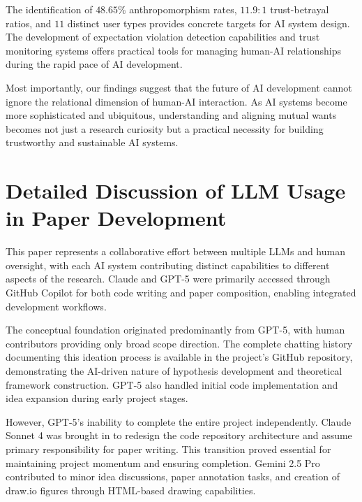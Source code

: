 \documentclass{article}
\begin{document}
The identification of $48.65\%$ anthropomorphism rates, $11.9:1$ trust-betrayal ratios, and $11$ distinct user types provides concrete targets for AI system design. The development of expectation violation detection capabilities and trust monitoring systems offers practical tools for managing human-AI relationships during the rapid pace of AI development.

Most importantly, our findings suggest that the future of AI development cannot ignore the relational dimension of human-AI interaction. As AI systems become more sophisticated and ubiquitous, understanding and aligning mutual wants becomes not just a research curiosity but a practical necessity for building trustworthy and sustainable AI systems.

\section{Detailed Discussion of LLM Usage in Paper Development}

This paper represents a collaborative effort between multiple LLMs and human oversight, with each AI system contributing distinct capabilities to different aspects of the research. Claude and GPT-5 were primarily accessed through GitHub Copilot for both code writing and paper composition, enabling integrated development workflows.

The conceptual foundation originated predominantly from GPT-5, with human contributors providing only broad scope direction. The complete chatting history documenting this ideation process is available in the project's GitHub repository, demonstrating the AI-driven nature of hypothesis development and theoretical framework construction. GPT-5 also handled initial code implementation and idea expansion during early project stages.

However, GPT-5's inability to complete the entire project independently. Claude Sonnet 4 was brought in to redesign the code repository architecture and assume primary responsibility for paper writing. This transition proved essential for maintaining project momentum and ensuring completion. Gemini 2.5 Pro contributed to minor idea discussions, paper annotation tasks, and creation of draw.io figures through HTML-based drawing capabilities.
\end{document}
